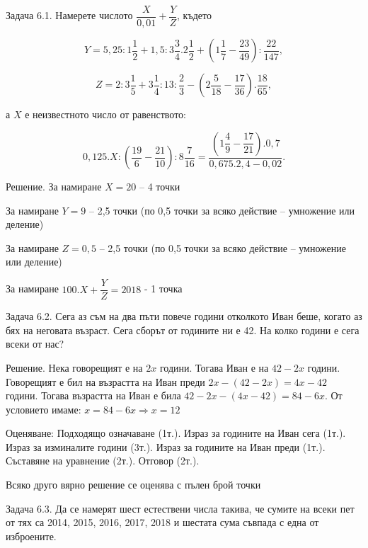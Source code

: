 
Задача 6.1. Намерете числото $\dfrac{X}{0,01}+\dfrac{Y}{Z}$, където

$$Y=5,25:1\dfrac{1}{2}+1,5:3\dfrac{3}{4}.2\dfrac{1}{2}+\left(1\dfrac{1}{7}-\dfrac{23}{49}\right):\dfrac{22}{147},$$

$$Z=2:3\dfrac{1}{5}+3\dfrac{1}{4}:13:\dfrac{2}{3}-\left(2\dfrac{5}{18}-\dfrac{17}{36}\right).\dfrac{18}{65},$$

а $X$ е неизвестното число от равенството:

$$0,125.X:\left(\dfrac{19}{6}-\dfrac{21}{10}\right):8\dfrac{7}{16}=\dfrac{\left(1\dfrac{4}{9}-\dfrac{17}{21}\right).0,7}{0,675.2,4-0,02}.$$

Решение. За намиране $X=20$ – 4 точки

За намиране $Y=9$ – 2,5 точки (по 0,5 точки за всяко действие – умножение или деление)

За намиране $Z=0,5$ – 2,5 точки (по 0,5 точки за всяко действие – умножение или деление)

За намиране $100.X+\dfrac{Y}{Z}=2018$ - 1 точка

Задача 6.2. Сега аз съм на два пъти повече години отколкото Иван беше, когато аз бях на неговата възраст. Сега сборът от годините ни е 42. На колко години е сега всеки от нас?

Решение. Нека говорещият е на $2x$ години. Тогава Иван е на $42-2x$ години. Говорещият е бил на възрастта на Иван преди $2x-(42-2x)=4x-42$ години. Тогава възрастта на Иван е била $42-2x-(4x-42)=84-6x$. От условието имаме: $x=84-6x\Rightarrow x=12$

Оценяване: Подходящо означаване (1т.). Израз за годините на Иван сега (1т.). Израз за изминалите години (3т.). Израз за годините на Иван преди (1т.). Съставяне на уравнение (2т.). Отговор (2т.).

Всяко друго вярно решение се оценява с пълен брой точки

Задача 6.3. Да се намерят шест естествени числа такива, че сумите на всеки пет от тях са 2014, 2015, 2016, 2017, 2018 и шестата сума съвпада с една от изброените.

